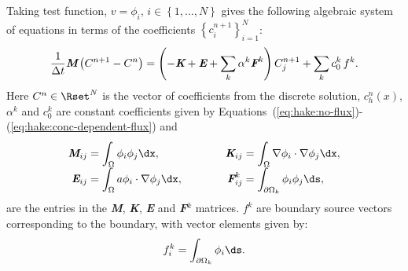Taking test function, $v=\phi_i$, $i\in\left\{1,\ldots,N\right\}$
gives the following algebraic system of equations in terms of the
coefficients $\left\{ c^{n+1}_i\right\}^N_{i=1}$:
\begin{equation}
  \label{eq:hake:algebraic-equation}
  \frac{1}{\Delta{}t}\text{\bfseries\itshape M}\left(C^{n+1}-C^n\right) =  \left(-\text{\bfseries\itshape K}+\text{\bfseries\itshape E}+\sum_k\alpha^k\text{\bfseries\itshape F}^k\right)C_j^{n+1}+\sum_k c_0^k\,f^k.
\end{equation}
Here $C^n\in \Rset^N$ is the vector of coefficients from the discrete
solution, $c^n_h(x)$, $\alpha^k$ and $c_0^k$ are constant coefficients
given by Equations~(\ref{eq:hake:no-flux})-(\ref{eq:hake:conc-dependent-flux})
and\\[-1.0em]
\begin{equation}
  \renewcommand{\arraystretch}{1.7}
  \renewcommand{\baselinestretch}{1.7}
  \begin{array}{r@{\;=\;}lcr@{\;=\;}l}
    \text{\bfseries\itshape M}_{ij}&\displaystyle\int_\Omega\phi_i\phi_j \dx,& \quad\quad&\text{\bfseries\itshape K}_{ij}&\displaystyle\int_\Omega\nabla\phi_i\cdot\nabla\phi_j \dx,\\
    \text{\bfseries\itshape E}_{ij}&\displaystyle\int_\Omega a\phi_i\cdot\nabla\phi_j \dx,& \quad\quad&\text{\bfseries\itshape F}^k_{ij}&\displaystyle\int_{\partial\Omega_k}\phi_i\phi_j \ds,
  \end{array}
  \renewcommand{\arraystretch}{1}
  \renewcommand{\baselinestretch}{1}
  \label{eq:hake:matrices}
\end{equation}
are the entries in the {\bfseries\itshape M}, {\bfseries\itshape K},
{\bfseries\itshape E} and {\bfseries\itshape F}$^k$ matrices. $f^k$
are boundary source vectors corresponding to the \kth boundary, with
vector elements given by:
\begin{equation}
  \label{eq:hake:vector}
  f^k_{i}=\int_{\partial\Omega_k}\phi_i \ds.
\end{equation}

